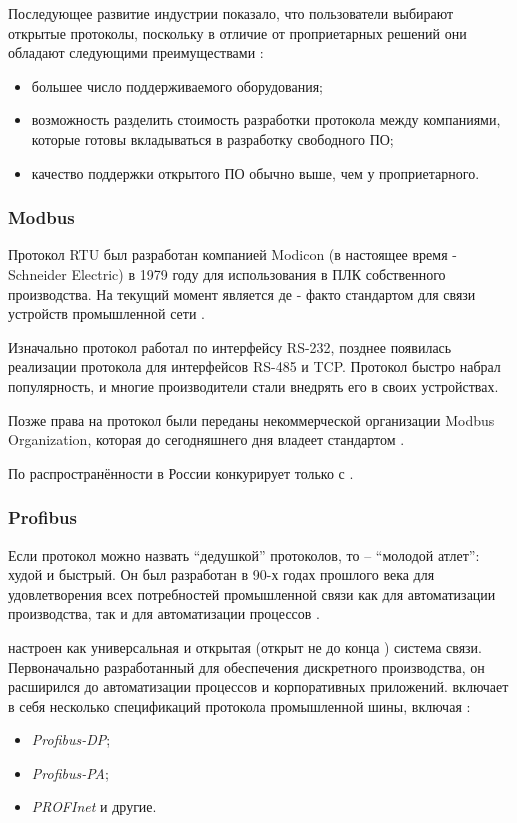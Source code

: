 Последующее развитие индустрии показало, что пользователи выбирают открытые протоколы, поскольку в отличие от проприетарных решений они обладают следующими преимуществами \cite{galloway_introduction_2012}:
\begin{itemize}
	\item большее число поддерживаемого оборудования;
	\item возможность разделить стоимость разработки протокола между компаниями, которые готовы вкладываться в разработку свободного ПО;
	\item качество поддержки открытого ПО обычно выше, чем у проприетарного.
\end{itemize}
\subsubsection{Modbus}
Протокол \mb{} RTU был разработан компанией Modicon (в настоящее время - Schneider Electric) в 1979 году для использования в ПЛК собственного производства. На текущий момент является де - факто стандартом для связи устройств промышленной сети \cite{__2001, van_gorp_advanced_2009}. 

Изначально протокол работал по интерфейсу RS-232, позднее появилась реализации протокола для интерфейсов RS-485 и TCP. Протокол быстро набрал популярность, и многие производители стали внедрять его в своих устройствах.

Позже права на протокол были переданы некоммерческой организации Modbus Organization, которая до сегодняшнего дня владеет стандартом \cite{advantech__2019}.

По распространённости в России конкурирует только с \pb \cite{__2010}. 
\subsubsection{Profibus}
Если протокол \mb{} можно назвать ``дедушкой'' протоколов, то \pb -- ``молодой атлет'': худой и быстрый. Он был разработан в 90-х годах прошлого века для удовлетворения всех потребностей промышленной связи
как для автоматизации производства, так и для автоматизации процессов \cite{powell_profibus_2013}.

\pb настроен как универсальная и открытая (открыт не до конца \cite{__2001}) система связи. Первоначально разработанный для обеспечения дискретного производства, он расширился до автоматизации процессов и корпоративных приложений. \pb включает в себя несколько спецификаций протокола промышленной шины, включая \cite{van_gorp_advanced_2009}:
\begin{itemize}
	\item \textit{Profibus-DP};
	\item \textit{Profibus-PA};
	\item \textit{PROFInet} и другие.
\end{itemize}

